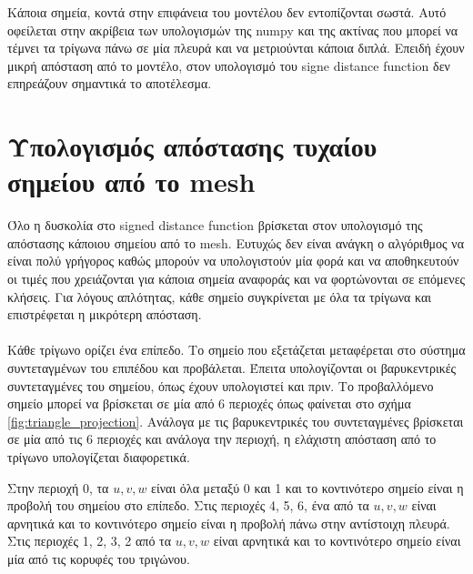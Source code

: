 \documentclass{report}
\begin{document}

Κάποια σημεία, κοντά στην επιφάνεια του μοντέλου δεν εντοπίζονται σωστά. Αυτό οφείλεται στην ακρίβεια των υπολογισμών της numpy
και της ακτίνας που μπορεί να τέμνει τα τρίγωνα πάνω σε μία πλευρά και να μετριούνται κάποια διπλά. Επειδή έχουν μικρή
απόσταση από το μοντέλο, στον υπολογισμό του signe distance function δεν επηρεάζουν σημαντικά το αποτέλεσμα.


\section{Υπολογισμός απόστασης τυχαίου σημείου από το mesh}
Όλο η δυσκολία στο signed distance function βρίσκεται στον υπολογισμό της απόστασης κάποιου σημείου από το mesh.
Ευτυχώς δεν είναι ανάγκη ο αλγόριθμος να είναι πολύ γρήγορος καθώς μπορούν να υπολογιστούν μία φορά και να
αποθηκευτούν οι τιμές που χρειάζονται για κάποια σημεία αναφοράς και να φορτώνονται σε επόμενες κλήσεις.
Για λόγους απλότητας, κάθε σημείο συγκρίνεται με όλα τα τρίγωνα και επιστρέφεται η μικρότερη απόσταση.
\\\\
Κάθε τρίγωνο ορίζει ένα επίπεδο. Το σημείο που εξετάζεται μεταφέρεται στο σύστημα συντεταγμένων του επιπέδου και προβάλεται.
Έπειτα υπολογίζονται οι βαρυκεντρικές συντεταγμένες του σημείου, όπως έχουν υπολογιστεί και πριν.
Το προβαλλόμενο σημείο μπορεί να βρίσκεται σε μία από 6 περιοχές όπως φαίνεται στο σχήμα \ref{fig:triangle_projection}.
Ανάλογα με τις βαρυκεντρικές του συντεταγμένες βρίσκεται σε μία από τις 6 περιοχές και ανάλογα την περιοχή,
η ελάχιστη απόσταση από το τρίγωνο υπολογίζεται διαφορετικά.

 \label{fig:triangle_projection}

Στην περιοχή 0, τα $u, v, w$ είναι όλα μεταξύ 0 και 1 και το κοντινότερο σημείο είναι η προβολή του σημείου στο επίπεδο.
Στις περιοχές 4, 5, 6, ένα από τα $u, v, w$ είναι αρνητικά και το κοντινότερο σημείο είναι η προβολή πάνω στην
αντίστοιχη πλευρά. Στις περιοχές 1, 2, 3, 2 από τα $u, v, w$ είναι αρνητικά και το κοντινότερο σημείο 
είναι μία από τις κορυφές του τριγώνου.



\clearpage
{}
\end{document}
